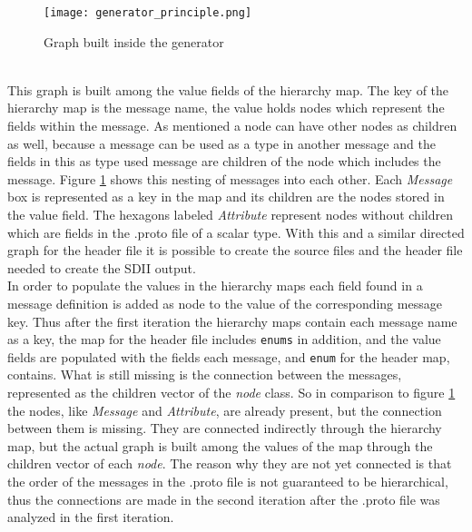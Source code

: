 \begin{figure}[!hbt]
\texttt{[image: generator\_principle.png]}
\caption{Graph built inside the generator}
\label{mfl_generation_graph}
\end{figure}
\\This graph is built among the value fields of the hierarchy map. The key of the hierarchy map is the message name, the value holds nodes which represent the fields within the message. As mentioned a node can have other nodes as children as well, because a message can be used as a type in another message and the fields in this as type used message are children of the node which includes the message. Figure \ref{mfl_generation_graph} shows this nesting of messages into each other. Each \emph{Message} box is represented as a key in the map and its children are the nodes stored in the value field. The hexagons labeled \emph{Attribute} represent nodes without children which are fields in the .proto file of a scalar type. With this and a similar directed graph for the header file it is possible to create the source files and the header file needed to create the SDII output.\\
In order to populate the values in the hierarchy maps each field found in a message definition is added as node to the value of the corresponding message key. Thus after the first iteration the hierarchy maps contain each message name as a key, the map for the header file includes \verb|enums| in addition, and the value fields are populated with the fields each message, and \verb|enum| for the header map, contains. What is still missing is the connection between the messages, represented as the children vector of the \emph{node} class. So in comparison to figure \ref{mfl_generation_graph} the nodes, like \emph{Message} and \emph{Attribute}, are already present, but the connection between them is missing. They are connected indirectly through the hierarchy map, but the actual graph is built among the values of the map through the children vector of each \emph{node}. The reason why they are not yet connected is that the order of the messages in the .proto file is not guaranteed to be hierarchical, thus the connections are made in the second iteration after the .proto file was analyzed in the first iteration.\\
